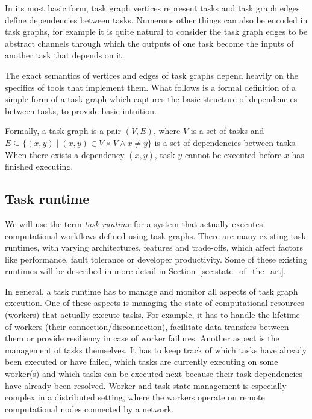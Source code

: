 In its most basic form, task graph vertices represent tasks and task graph
edges define dependencies between tasks. Numerous other things can also be encoded in task graphs,
for example it is quite natural to consider the task graph edges to be abstract channels through
which the outputs of one task become the inputs of another task that depends on it.

The exact semantics of vertices and edges of task graphs depend heavily on the specifics of tools
that implement them. What follows is a formal definition of a simple form of a task graph which
captures the basic structure of dependencies between tasks, to provide basic intuition.

Formally, a task graph is a pair $(V, E)$, where $V$ is a set of tasks and
$E \subseteq \{(x, y) \mid (x, y) \in V\times{}V \land x \neq y \}$ is a set of dependencies
between tasks. When there exists a dependency $(x, y)$, task $y$ cannot be executed before $x$ has
finished executing.



\subsection{Task runtime}
We will use the term \emph{task runtime} for a system that actually executes
computational workflows defined using task graphs. There are many existing task runtimes,
with varying architectures, features and trade-offs, which affect factors like performance, fault
tolerance or developer productivity. Some of these existing runtimes will be described in more
detail in Section~\ref{sec:state_of_the_art}.

In general, a task runtime has to manage and monitor all aspects of task graph execution.
One of these aspects is managing the state of computational resources (workers) that actually
execute tasks. For example, it has to handle the lifetime of workers (their
connection/disconnection), facilitate data transfers between them or provide resiliency in case of
worker failures. Another aspect is the management of tasks themselves. It has to keep track of
which tasks have already been executed or have failed, which tasks are currently executing on some
worker(s) and which tasks can be executed next because their task dependencies have already been
resolved. Worker and task state management is especially complex in a distributed setting, where
the workers operate on remote computational nodes connected by a network.

